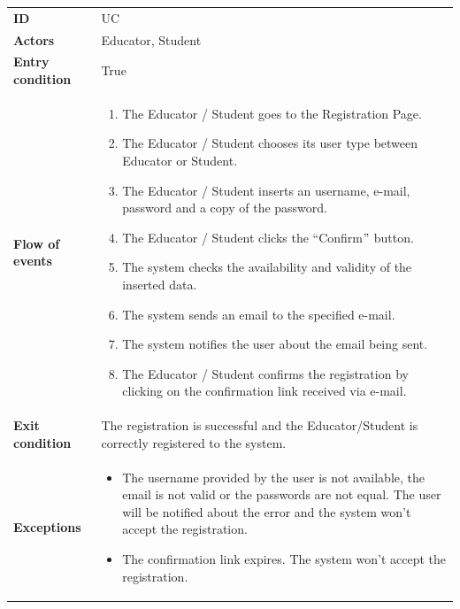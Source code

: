\documentclass[11pt]{report}
\newcounter{uccounter}
\newcommand{\uc}{

    \addtocounter{uccounter}{1}
    UC\arabic{uccounter}
}
\begin{document}
\begin{center}
\begin{tabular}[h] {|>{\columncolor[gray]{0.8}}l|p{100mm}|}
    \hline
    \multicolumn{2}{|c|}{\textbf{Register}} \\
    \hline
    \textbf{ID} & \uc
    \\
    \hline
    \textbf{Actors} & Educator, Student
    \\
    \hline
    \textbf{Entry condition} &  True
    \\
    \hline
    \textbf{Flow of events}  & 
    \begin{enumerate}
        \item The Educator / Student goes to the Registration Page.
        \item The Educator / Student chooses its user type between Educator or Student.
        \item The Educator / Student inserts an username, e-mail, password and a copy of the password.
        \item The Educator / Student clicks the ``Confirm\("\) button.
        \item The system checks the availability and validity of the inserted data.
        \item The system sends an email to the specified e-mail.
        \item The system notifies the user about the email being sent.
        \item The Educator / Student confirms the registration by clicking on the confirmation link received via e-mail.
    \end{enumerate}
    \\
    \hline
    \textbf{Exit condition}  & 
    The registration is successful and the Educator/Student is correctly registered to the system.
    \\
    \hline
    \textbf{Exceptions}  & 
    \begin{itemize}
        \item The username provided by the user is not available, the email is not valid or the passwords are not equal.
        The user will be notified about the error and the system won't accept the registration.
        \item The confirmation link expires.
        The system won't accept the registration.
    \end{itemize}
    \\
    \hline
\end{tabular}
\end{center}
\end{document}
